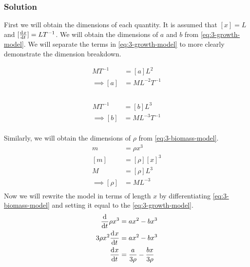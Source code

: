 \documentclass[12pt,twoside]{article}
\begin{document}
\subsubsection*{Solution}
First we will obtain the dimensions of each quantity. It is assumed that $[x]=L$
and $[\frac{\mathrm{d}^{} {x}}{\mathrm{d}{t}^{}}]=LT^{-1}$. We will obtain the dimensions of $a$ and $b$ from
\cref{eq:3-growth-model}. We will separate the terms in \cref{eq:3-growth-model} to
more clearly demonstrate the dimension breakdown.
\vspace{-2em}
\begin{multicols}{2}
  \begin{equation*}
    \begin{aligned}
      MT^{-1} &= [a]L^2 \\
      \implies [a] &= ML^{-2}T^{-1} \\
    \end{aligned}
  \end{equation*} \\
  \begin{equation*}
    \begin{aligned}
      MT^{-1} &= [b]L^3 \\
      \implies [b] &= ML^{-3}T^{-1} \\
    \end{aligned}
  \end{equation*}
\end{multicols}
\noindent
Similarly, we will obtain the dimensions of $\rho$ from \cref{eq:3-biomass-model}.
\begin{equation*}
  \begin{aligned}
    m &= \rho x^3 \\
    [m] &= [\rho] [x]^3 \\
    M &= [\rho] L^3 \\
    \implies [\rho] &= ML^{-3} \\
  \end{aligned}
\end{equation*}
Now we will rewrite the model in terms of length $x$ by differentiating \cref{eq:3-biomass-model} and
setting it equal to the \cref{eq:3-growth-model}.
\begin{equation}
  \begin{aligned}
    \label{eq:model-in-terms-of-x}
    \frac{\mathrm{d}^{} {}}{\mathrm{d}{t}^{}}\rho x^3 &= ax^2-bx^3 \\
    3\rho x^2\frac{\mathrm{d}^{} {x}}{\mathrm{d}{t}^{}} &= ax^2-bx^3 \\
    \frac{\mathrm{d}^{} {x}}{\mathrm{d}{t}^{}} &= \frac{a}{3\rho} - \frac{bx}{3\rho} \\
  \end{aligned}
\end{equation}
\end{document}
